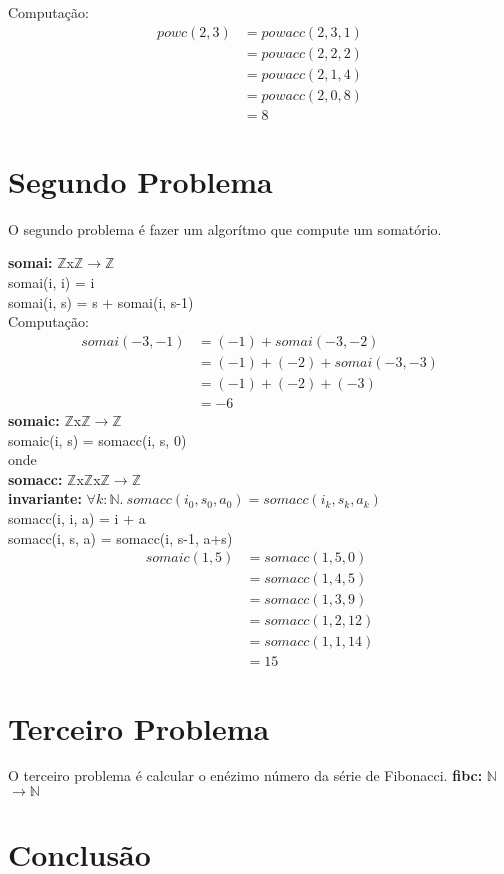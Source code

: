 \documentclass{article}
\begin{document}
Computação:\\
\begin{align*}
powc(2, 3) &= powacc(2, 3, 1)\\
&= powacc(2, 2, 2)\\
&= powacc(2, 1, 4)\\
&= powacc(2, 0, 8)\\
&= 8
\end{align*}

\section{Segundo Problema}
O segundo problema é fazer um algorítmo que compute um somatório.

\noindent \textbf{somai:} $\mathbb{Z}$x$\mathbb{Z}$$ \rightarrow \mathbb{Z}$\\
somai(i, i) = i\\
somai(i, s) = s + somai(i, s-1)\\
Computação:
\begin{align*}
somai(-3, -1) &= (-1) + somai(-3, -2)\\
&= (-1) + (-2) + somai(-3, -3)\\
&= (-1) + (-2) + (-3)\\
&= -6
\end{align*}
\noindent \textbf{somaic:} $\mathbb{Z}$x$\mathbb{Z}$$ \rightarrow \mathbb{Z}$\\
somaic(i, s) = somacc(i, s, 0)\\
onde\\
\indent \textbf{somacc:} $\mathbb{Z}$x$\mathbb{Z}$x$\mathbb{Z}$$ \rightarrow \mathbb{Z}$\\
\indent \textbf{invariante:} $\forall k:\mathbb{N}.\: somacc(i_0, s_0, a_0) = somacc(i_k, s_k, a_k)$\\
\indent somacc(i, i, a) = i + a\\
\indent somacc(i, s, a) = somacc(i, s-1, a+s)\\
\begin{align*}
somaic(1, 5) &= somacc(1, 5, 0)\\
&= somacc(1, 4, 5)\\
&= somacc(1, 3, 9)\\
&= somacc(1, 2, 12)\\
&= somacc(1, 1, 14)\\
&= 15
\end{align*}
\section{Terceiro Problema}
O terceiro problema é calcular o enézimo número da série de Fibonacci.
\textbf{fibc:} $\mathbb{N}$$ \rightarrow \mathbb{N}$\\
\section{Conclusão}
\end{document}
